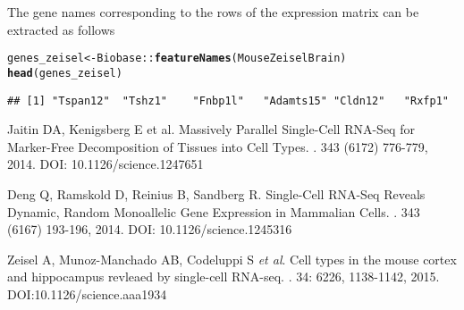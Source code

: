 \documentclass[12pt]{article}\usepackage[]{graphicx}\usepackage[usenames,dvipsnames]{color}
\makeatletter
\newcommand{\hlopt}[1]{\textcolor[rgb]{0,0,0}{#1}}%
\newcommand{\hlstd}[1]{\textcolor[rgb]{0.345,0.345,0.345}{#1}}%
\newcommand{\hlkwb}[1]{\textcolor[rgb]{0.69,0.353,0.396}{#1}}%
\newcommand{\hlkwd}[1]{\textcolor[rgb]{0.737,0.353,0.396}{\textbf{#1}}}%
\newenvironment{kframe}{%
 \def\at@end@of@kframe{}%
 \ifinner\ifhmode%
  \def\at@end@of@kframe{\end{minipage}}%
  \begin{minipage}{\columnwidth}%
 \fi\fi%
 \def\FrameCommand##1{\hskip\@totalleftmargin \hskip-\fboxsep
 \colorbox{shadecolor}{##1}\hskip-\fboxsep
     \hskip-\linewidth \hskip-\@totalleftmargin \hskip\columnwidth}%
 \MakeFramed {\advance\hsize-\width
   \@totalleftmargin\z@ \linewidth\hsize
   \@setminipage}}%
 {\par\unskip\endMakeFramed%
 \at@end@of@kframe}
\newenvironment{knitrout}{}{} %
\makeatother
\begin{document}
The gene names corresponding to the rows of the expression matrix can be
extracted as follows

\begin{knitrout}
\color{fgcolor}\begin{kframe}
\begin{alltt}
\hlstd{genes_zeisel} \hlkwb{<-} \hlstd{Biobase}\hlopt{::}\hlkwd{featureNames}\hlstd{(MouseZeiselBrain)}
\hlkwd{head}\hlstd{(genes_zeisel)}
\end{alltt}
\begin{verbatim}
## [1] "Tspan12"  "Tshz1"    "Fnbp1l"   "Adamts15" "Cldn12"   "Rxfp1"
\end{verbatim}
\end{kframe}
\end{knitrout}


\begin{thebibliography}{1}

Jaitin DA,  Kenigsberg E et al.
\newblock Massively Parallel Single-Cell RNA-Seq for Marker-Free Decomposition
of Tissues into Cell Types.
. 343 (6172) 776-779, 2014. DOI: 10.1126/science.1247651

Deng Q,  Ramskold D,  Reinius B,  Sandberg R.
\newblock Single-Cell RNA-Seq Reveals Dynamic, Random Monoallelic Gene
Expression in Mammalian Cells.
.  343 (6167) 193-196, 2014. DOI: 10.1126/science.1245316

Zeisel A, Munoz-Manchado AB, Codeluppi S \textit{et al}.
\newblock Cell types in the mouse cortex and hippocampus revleaed by
single-cell RNA-seq.
.  34: 6226, 1138-1142, 2015. DOI:10.1126/science.aaa1934

\end{thebibliography}
\end{document}
